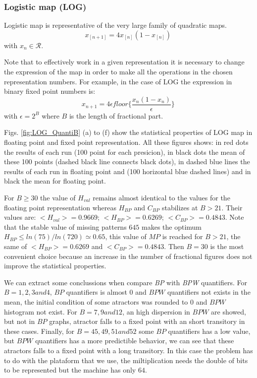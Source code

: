 \subsubsection{Logistic map (LOG)} \label{subsubsec:log}

Logistic map is representative of the very large family of quadratic maps. 
\begin{equation}\label{eq:logimap}
 x_{[n+1]}=4x_{[n]}(1-x_{[n]}) \,
\end{equation}
with $x_n\in\mathcal{R}$.

Note that to effectively work in a given representation it is necessary to change the expression of the map in order to make all the operations in the chosen representation numbers. For example, in the case of LOG the expression in binary fixed point numbers is:
\begin{equation}\label{eq:logimapB2}
x_{n+1}=4 \epsilon floor\{\frac{x_n(1-x_n)}{\epsilon}\} \,
\end{equation}
with $\epsilon = 2^B$ where $B$ is the length of fractional part.

Figs. \ref{fig:LOG_QuantiB} (a) to (f) show the statistical properties of LOG map in floating point and fixed point representation.
All these figures shows: in red dots the results of each run (100 point for each presicion), in black dots the mean of these 100 points (dashed black line connects black dots), in dashed blue lines the results of each run in floating point and (100 horizontal blue dashed lines) and in black the mean for floating point.

For $B\geq 30$ the value of $H_{val}$ remains almost identical to the values for the floating point representation whereas $H_{BP}$ and $C_{BP}$ stabilizes at $B>21$.
Their values are: $<H_{val}>=0.9669$; $<H_{BP}>=0.6269$; $<C_{BP}>=0.4843$.
Note that the stable value of missing patterns $645$ makes the optimum $H_{BP} \leq ln(75)/ln(720) \simeq 0.65$, this value of $MP$ is reached for $B>21$, the same of $<H_{BP}>=0.6269$ and $<C_{BP}>=0.4843$.
Then $B=30$ is the most convenient choice because an increase in the number of fractional figures does not improve the statistical properties.

We can extract some conclussions when compare \textit{BP} with \textit{BPW} quantifiers.
For $B=1, 2, 3 and 4$, $BP$ quantifiers is almost $0$ and $BPW$ quantifiers not exists in the mean, the initial condition of some atractors was rounded to $0$ and $BPW$ histogram not exist.
For $B=7, 9 and 12$, an high dispersion in $BPW$ are showed, but not in $BP$ graphs, atractor falls to a fixed point with an short transitory in these cases.
Finally, for $B = 45, 49, 51 and 52$ some $BP$ quantifiers has a low value, but $BPW$ quantifiers has a more predictible behavior, we can see that these atractors falls to a fixed point with a long transitory.
In this case the problem has to do with the plataform that we use, the miltiplication needs the double of bits to be represented but the machine has only $64$.

